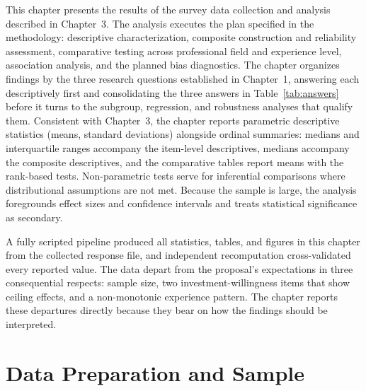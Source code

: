 \label{chap:Chapter_4}

This chapter presents the results of the survey data collection and analysis described in Chapter~3. The analysis executes the plan specified in the methodology: descriptive characterization, composite construction and reliability assessment, comparative testing across professional field and experience level, association analysis, and the planned bias diagnostics. The chapter organizes findings by the three research questions established in Chapter~1, answering each descriptively first and consolidating the three answers in Table~\ref{tab:answers} before it turns to the subgroup, regression, and robustness analyses that qualify them. Consistent with Chapter~3, the chapter reports parametric descriptive statistics (means, standard deviations) alongside ordinal summaries: medians and interquartile ranges accompany the item-level descriptives, medians accompany the composite descriptives, and the comparative tables report means with the rank-based tests. Non-parametric tests serve for inferential comparisons where distributional assumptions are not met. Because the sample is large, the analysis foregrounds effect sizes and confidence intervals and treats statistical significance as secondary.

A fully scripted pipeline produced all statistics, tables, and figures in this chapter from the collected response file, and independent recomputation cross-validated every reported value. The data depart from the proposal's expectations in three consequential respects: sample size, two investment-willingness items that show ceiling effects, and a non-monotonic experience pattern. The chapter reports these departures directly because they bear on how the findings should be interpreted.

\section{Data Preparation and Sample}

